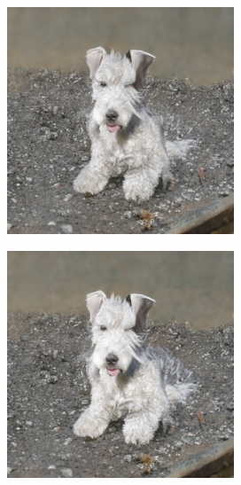 \documentclass{article}
\begin{document}
\begin{figure}
\begin{subfigure}[b]{0.19\linewidth}
    \end{subfigure}
    \begin{subfigure}[b]{0.19\linewidth}
    \includegraphics[width=\linewidth]{figures/imagenet256/solver_samples/imagenet256_fm_ot_14_20.png}
    \end{subfigure}
    \begin{subfigure}[b]{0.19\linewidth}
    \includegraphics[width=\linewidth]{figures/imagenet256/solver_samples/imagenet256_fm_ot_14_30.png}

\end{subfigure}
\end{figure}
\end{document}

